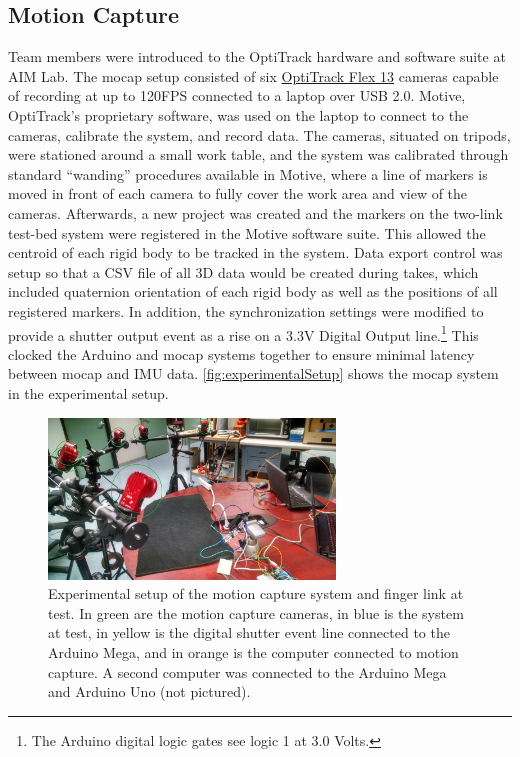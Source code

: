 \documentclass[letterpaper, 10 pt, conference]{ieeeconf}  %
\begin{document}
\subsection{Motion Capture}
Team members were introduced to the OptiTrack hardware and software suite at AIM Lab. The mocap setup consisted of six \href{http://optitrack.com/products/flex-13/}{OptiTrack Flex 13} cameras capable of recording at up to 120FPS connected to a laptop over USB 2.0. Motive, OptiTrack's proprietary software, was used on the laptop to connect to the cameras, calibrate the system, and record data. The cameras, situated on tripods, were stationed around a small work table, and the system was calibrated through standard ``wanding'' procedures available in Motive, where a line of markers is moved in front of each camera to fully cover the work area and view of the cameras. Afterwards, a new project was created and the markers on the two-link test-bed system were registered in the Motive software suite. This allowed the centroid of each rigid body to be tracked in the system. Data export control was setup so that a CSV file of all 3D data would be created during takes, which included quaternion orientation of each rigid body as well as the positions of all registered markers. In addition, the synchronization settings were modified to provide a shutter output event as a rise on a 3.3V Digital Output line.\footnote{The Arduino digital logic gates see logic 1 at 3.0 Volts.} This clocked the Arduino and mocap systems together to ensure minimal latency between mocap and IMU data. \autoref{fig:experimentalSetup} shows the mocap system in the experimental setup.

\begin{figure}[thpb]
	\centering
	\includegraphics[width = 3in]{experimental_setup.jpg}
    \caption{Experimental setup of the motion capture system and finger link at test. In green are the motion capture cameras, in blue is the system at test, in yellow is the digital shutter event line connected to the Arduino Mega, and in orange is the computer connected to motion capture. A second computer was connected to the Arduino Mega and Arduino Uno (not pictured).}
    \label{fig:experimentalSetup}
\end{figure}
\end{document}
